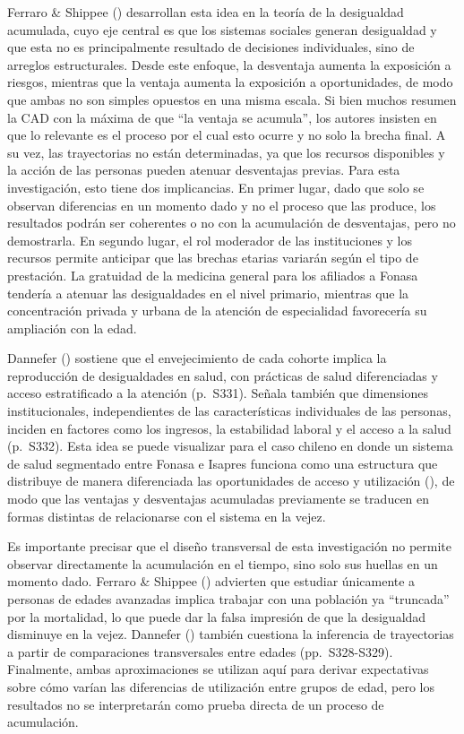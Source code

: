 \documentclass[
  spanish,
  a4paper,
  oneside]{scrbook}
\begin{document}
Ferraro \& Shippee () desarrollan
esta idea en la teoría de la desigualdad acumulada, cuyo eje central es
que los sistemas sociales generan desigualdad y que esta no es
principalmente resultado de decisiones individuales, sino de arreglos
estructurales. Desde este enfoque, la desventaja aumenta la exposición a
riesgos, mientras que la ventaja aumenta la exposición a oportunidades,
de modo que ambas no son simples opuestos en una misma escala. Si bien
muchos resumen la CAD con la máxima de que ``la ventaja se acumula'',
los autores insisten en que lo relevante es el proceso por el cual esto
ocurre y no solo la brecha final. A su vez, las trayectorias no están
determinadas, ya que los recursos disponibles y la acción de las
personas pueden atenuar desventajas previas. Para esta investigación,
esto tiene dos implicancias. En primer lugar, dado que solo se observan
diferencias en un momento dado y no el proceso que las produce, los
resultados podrán ser coherentes o no con la acumulación de desventajas,
pero no demostrarla. En segundo lugar, el rol moderador de las
instituciones y los recursos permite anticipar que las brechas etarias
variarán según el tipo de prestación. La gratuidad de la medicina
general para los afiliados a Fonasa tendería a atenuar las desigualdades
en el nivel primario, mientras que la concentración privada y urbana de
la atención de especialidad favorecería su ampliación con la edad.

Dannefer () sostiene que el
envejecimiento de cada cohorte implica la reproducción de desigualdades
en salud, con prácticas de salud diferenciadas y acceso estratificado a
la atención (p.~S331). Señala también que dimensiones institucionales,
independientes de las características individuales de las personas,
inciden en factores como los ingresos, la estabilidad laboral y el
acceso a la salud (p.~S332). Esta idea se puede visualizar para el caso
chileno en donde un sistema de salud segmentado entre Fonasa e Isapres
funciona como una estructura que distribuye de manera diferenciada las
oportunidades de acceso y utilización
(), de modo que las ventajas y desventajas acumuladas previamente se
traducen en formas distintas de relacionarse con el sistema en la vejez.

Es importante precisar que el diseño transversal de esta investigación
no permite observar directamente la acumulación en el tiempo, sino solo
sus huellas en un momento dado. Ferraro \& Shippee
() advierten que estudiar
únicamente a personas de edades avanzadas implica trabajar con una
población ya ``truncada'' por la mortalidad, lo que puede dar la falsa
impresión de que la desigualdad disminuye en la vejez. Dannefer
() también cuestiona la
inferencia de trayectorias a partir de comparaciones transversales entre
edades (pp.~S328-S329). Finalmente, ambas aproximaciones se utilizan
aquí para derivar expectativas sobre cómo varían las diferencias de
utilización entre grupos de edad, pero los resultados no se
interpretarán como prueba directa de un proceso de acumulación.
\end{document}
